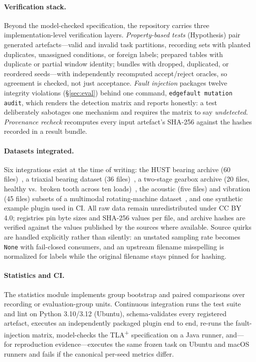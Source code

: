 \paragraph{Verification stack.}
Beyond the model-checked specification, the repository carries three
implementation-level verification layers. \emph{Property-based tests}
(Hypothesis) pair generated artefacts---valid and invalid task partitions,
recording sets with planted duplicates, unassigned conditions, or foreign
labels; prepared tables with duplicate or partial window identity; bundles
with dropped, duplicated, or reordered seeds---with independently recomputed
accept/reject oracles, so agreement is checked, not just acceptance.
\emph{Fault injection} packages twelve integrity violations
(\S\ref{sec:eval}) behind one command, \texttt{edgefault mutation audit},
which renders the detection matrix and reports honestly: a test deliberately
sabotages one mechanism and requires the matrix to say \emph{undetected}.
\emph{Provenance recheck} recomputes every input artefact's SHA-256 against
the hashes recorded in a result bundle.

\paragraph{Datasets integrated.}
Six integrations exist at the time of writing: the HUST bearing archive (60
files)~\cite{hustbearing}, a triaxial bearing dataset (36
files)~\cite{mehranbearing}, a two-stage gearbox archive (20 files,
healthy vs.\ broken tooth across ten loads)~\cite{gearboxdata}, the acoustic
(five files) and vibration (45 files) subsets of a multimodal rotating-machine
dataset~\cite{jung2023kaist}, and one synthetic example plugin used in CI.
All raw data remain unredistributed under CC BY 4.0; registries pin byte
sizes and SHA-256 values per file, and archive hashes are verified against
the values published by the sources where available. Source quirks are
handled explicitly rather than silently: an unstated sampling rate becomes
\texttt{None} with fail-closed consumers, and an upstream filename
misspelling is normalized for labels while the original filename stays
pinned for hashing.

\paragraph{Statistics and CI.}
The statistics module implements group bootstrap and paired comparisons over
recording or evaluation-group units. Continuous integration runs the test
suite and lint on Python 3.10/3.12 (Ubuntu), schema-validates every
registered artefact, executes an independently packaged plugin end to end,
re-runs the fault-injection matrix, model-checks the TLA\textsuperscript{+}
specification on a Java runner, and---for reproduction evidence---executes
the same frozen task on Ubuntu and macOS runners and fails if the canonical
per-seed metrics differ.
